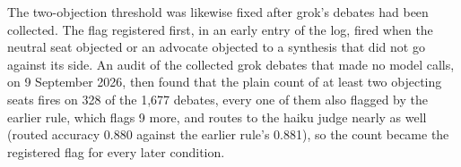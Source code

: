 The two-objection threshold was likewise fixed after grok's debates had been
collected. The flag registered first, in an early entry of the log, fired
when the neutral seat objected or an advocate objected to a synthesis that
did not go against its side. An audit of the collected grok debates that
made no model calls, on 9 September 2026, then found that the plain count of
at least two objecting seats fires on 328 of the 1,677 debates, every one of them also flagged by
the earlier rule, which flags 9 more, and routes to the haiku judge nearly as
well (routed accuracy 0.880 against the earlier rule's 0.881), so the count
became the registered flag for every later condition.

